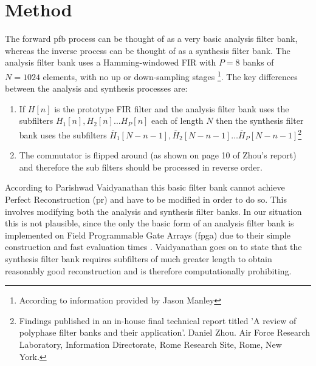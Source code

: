\documentclass[a4paper,10pt]{article}
\begin{document}
\section{Method}
The forward \gls{pfb} process can be thought of as a very basic analysis filter bank, whereas the inverse process can be thought of as a synthesis filter bank. The 
analysis filter bank uses a Hamming-windowed FIR with $P=8$ banks of $N=1024$ elements, with no up or down-sampling stages \footnote{According to information provided by Jason Manley}. 
The key differences between the analysis and synthesis processes are:
\begin{enumerate}
 \item If $H[n]$ is the prototype FIR filter and the analysis filter bank uses the subfilters $H_1[n], H_2[n] \dots H_P[n]$ each of length $N$ then the synthesis filter bank
 uses the subfilters $\bar H_1[N-n-1], \bar H_2[N-n-1] \dots \bar H_P[N-n-1]$\footnote{Findings published in an in-house final technical report titled 'A review of polyphase filter 
 banks and their application'. Daniel Zhou. Air Force Research Laboratory, Information Directorate, Rome Research Site, Rome, New York.}
 \item The commutator is flipped around (as shown on page 10 of Zhou's report) and therefore the sub filters should be processed in reverse order.
\end{enumerate}

According to Parishwad Vaidyanathan \cite{vaidyanathan1990multirate} this basic filter bank cannot achieve Perfect Reconstruction (\gls{pr}) and have to be modified in order to
do so. This involves modifying both the analysis and synthesis filter banks. In our situation this is not plausible, since the only the basic form of an analysis filter bank
is implemented on Field Programmable Gate Arrays (\gls{fpga}) due to their simple construction and fast evaluation times \cite{vaidyanathan1990multirate}. Vaidyanathan goes on
to state that the synthesis filter bank requires subfilters of much greater length to obtain reasonably good reconstruction and is therefore computationally prohibiting.

\pagebreak
{}

\end{document}
